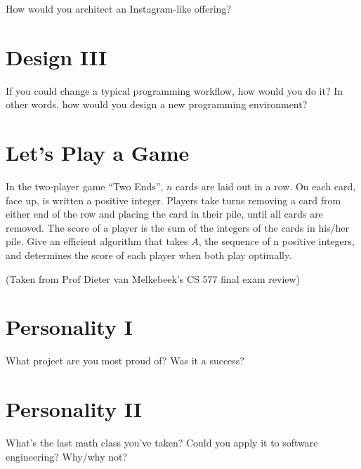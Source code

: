 \documentclass[12pt,runningheads]{article}
\begin{document}
How would you architect an Instagram-like offering?

\begin{comment}
Open to interpretation of correctness ;)
Should mention front-end and back-end decisions.
How would data be managed (internationally)? Example: sharding
\end{comment}

\newpage

\section{Design III}

If you could change a typical programming workflow, how would you do it? In other words, how would you design a new programming environment?


\newpage

\section{Let's Play a Game}
In the two-player game “Two Ends”, $n$ cards are laid out in a row. On each card, face up, is written
a positive integer. Players take turns removing a card from either end of the row and placing the card
in their pile, until all cards are removed. The score of a player is the sum of the integers of the cards
in his/her pile.
Give an efficient algorithm that takes $A$, the sequence of n positive integers, and determines the score of
each player when both play optimally.

(Taken from Prof Dieter van Melkebeek's CS 577 final exam review)
\begin{comment}
This problem requires a dynamic programming solution.
\end{comment}
\newpage

\section{Personality I}

What project are you most proud of? Was it a success?

\newpage

\section{Personality II}

What's the last math class you've taken? Could you apply it to software engineering? Why/why not?
\end{document}
